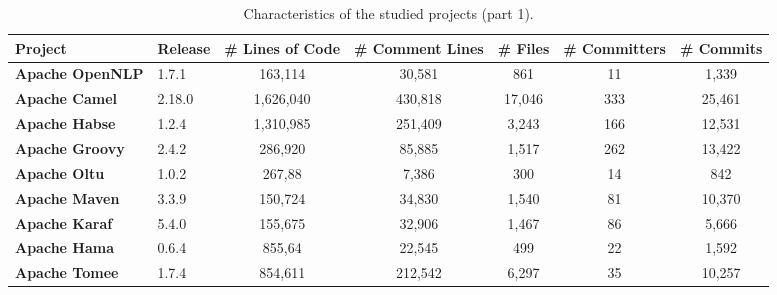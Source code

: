 \begin{landscape}


\begin{table}[htbp]
	\small
	\centering
	\caption{Characteristics of the studied projects (part 1).}
	\begin{adjustbox}{width=1.3\textwidth}


		\begin{tabular}{l|l|c|c|c|c|c}
			\hline
			\textbf{Project}           & \textbf{Release} & \textbf{\# Lines of Code} & \textbf{\# Comment Lines} & \textbf{\# Files} & \textbf{\# Committers} & \textbf{\# Commits} \\ \hline
			\textbf{Apache OpenNLP}    & 1.7.1            &          163,114           &           30,581           &        861        &           11           &        1,339         \\ \hline
			\textbf{Apache Camel}      & 2.18.0           &          1,626,040          &          430,818           &       17,046       &          333           &        25,461        \\ \hline
			\textbf{Apache Habse}      & ‎1.2.4           &          1,310,985          &          251,409           &       3,243        &          166           &        12,531        \\ \hline
			\textbf{Apache Groovy}     & 2.4.2            &          286,920           &           85,885           &       1,517        &          262           &        13,422        \\ \hline
			\textbf{Apache Oltu}       & 1.0.2            &           267,88           &           7,386            &        300        &           14            &         842         \\ \hline
			\textbf{Apache Maven}      & 3.3.9            &          150,724           &           34,830           &       1,540        &           81           &        10,370        \\ \hline
			\textbf{Apache Karaf}      & 5.4.0            &          155,675           &           32,906           &       1,467        &           86           &        5,666         \\ \hline
			\textbf{Apache Hama}       & 0.6.4            &           855,64           &           22,545           &        499        &           22           &        1,592         \\ \hline
			\textbf{Apache Tomee}      & 1.7.4            &          854,611           &          212,542           &       6,297        &           35           &        10,257        \\ \hline

\end{tabular}
\end{adjustbox}
\end{table}
\end{landscape}
